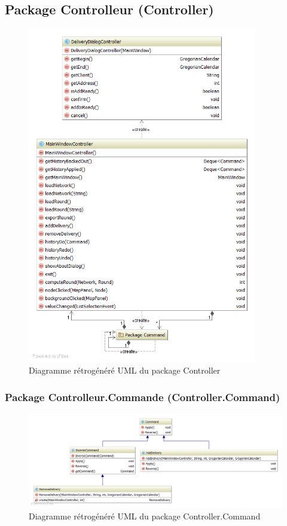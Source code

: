 \subsection{Package Controlleur (Controller)}

\begin{figure}[h]
    \centering
    \includegraphics[width=100mm]{../diagrams/classes_packages/final_classes_packages/controller/controller.png}
    \caption{Diagramme r\'etrog\'en\'er\'e UML du package Controller}
    \label{diagram:gen_uml_controller}
\end{figure}
\pagebreak

\begin{landscape}
\subsubsection{Package Controlleur.Commande (Controller.Command)}

\begin{figure}[h]
    \centering
    \includegraphics[width=240mm]{../diagrams/classes_packages/final_classes_packages/controller/package_command.png}
    \caption{Diagramme r\'etrog\'en\'er\'e UML du package Controller.Command}
    \label{diagram:gen_uml_controller_command}
\end{figure}
\end{landscape}

